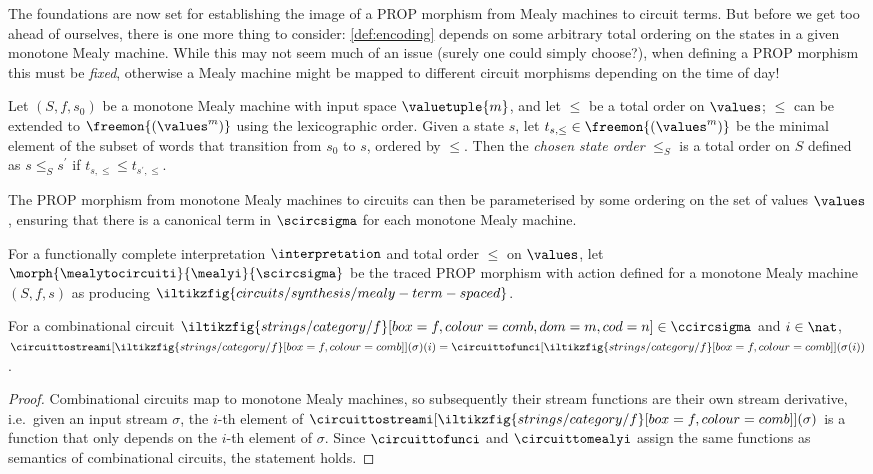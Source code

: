 The foundations are now set for establishing the image of a PROP morphism from
Mealy machines to circuit terms.
But before we get too ahead of ourselves, there is one more thing to consider:
\cref{def:encoding} depends on some arbitrary total ordering on the states in a
given monotone Mealy machine.
While this may not seem much of an issue (surely one could simply choose?), when
defining a PROP morphism this must be \emph{fixed}, otherwise a Mealy machine
might be mapped to different circuit morphisms depending on the time of day!

\begin{definition}
    Let \((S, f, s_0)\) be a monotone Mealy machine with input space
    \(\valuetuple{m}\), and let \(\leq\) be a total order on \(\values\);
    \(\leq\) can be extended to \(\freemon{(\values^m)}\) using the
    lexicographic order.
    Given a state \(s\), let \(t_{s,\leq} \in \freemon{(\values^m)}\) be
    the minimal element of the subset of words that transition from \(s_0\) to
    \(s\), ordered by \(\leq\).
    Then the \emph{chosen state order} \(\leq_S\) is a total order on \(S\)
    defined as \(s \leq_S s^\prime\) if \(t_{s,\leq} \leq t_{s^\prime,\leq}\).
\end{definition}

The PROP morphism from monotone Mealy machines to circuits can then be
parameterised by some ordering on the set of values \(\values\), ensuring that
there is a canonical term in \(\scircsigma\) for each monotone Mealy machine.

\begin{definition}\label{def:mealy-to-circuit}
    For a functionally complete interpretation \(\interpretation\) and total
    order \(\leq\) on \(\values\), let \(
        \morph{
            \mealytocircuiti
        }{
            \mealyi
        }{
            \scircsigma
        }
    \) be the traced PROP morphism with action defined for a monotone Mealy
    machine \((S,f,s)\) as producing \(
        \iltikzfig{circuits/synthesis/mealy-term-spaced}
    \).
\end{definition}

\begin{lemma}
    For a combinational circuit \(
        \iltikzfig{strings/category/f}[box=f,colour=comb,dom=m,cod=n]
        \in \ccircsigma
    \) and \(i \in \nat\), \(
        \circuittostreami[
            \iltikzfig{strings/category/f}[box=f,colour=comb]
        ](\sigma)(i)
        =
        \circuittofunci[
            \iltikzfig{strings/category/f}[box=f,colour=comb]
        ](\sigma(i))
    \).
\end{lemma}
\begin{proof}
    Combinational circuits map to monotone Mealy machines, so subsequently
    their stream functions are their own stream derivative, i.e.\ given an
    input stream \(\sigma\), the \(i\)-th element of \(
        \circuittostreami[
            \iltikzfig{strings/category/f}[box=f,colour=comb]
        ](\sigma)
    \) is a function that only depends on the \(i\)-th element of \(\sigma\).
    Since \(\circuittofunci\) and \(\circuittomealyi\) assign the same functions
    as semantics of combinational circuits, the statement holds.
\end{proof}

